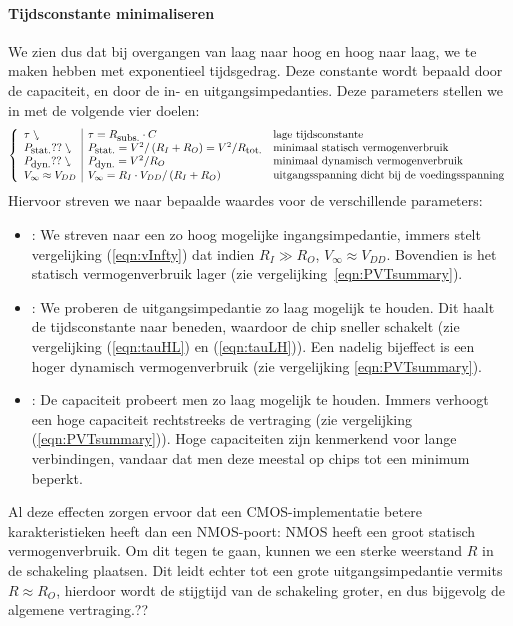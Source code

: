 \paragraph{Tijdsconstante minimaliseren}
We zien dus dat bij overgangen van laag naar hoog en hoog naar laag, we te maken hebben met exponentieel tijdsgedrag. Deze constante wordt bepaald door de capaciteit, en door de in- en uitgangsimpedanties. Deze parameters stellen we in met de volgende vier doelen:
\begin{equation}
\left\{\begin{array}{l|ll}
\tau\ssearrow&\tau=R_{\mbox{\small{subs.}}}\cdot C&\mbox{lage tijdsconstante}\\
P_{\mbox{\small{stat.}}}??\ssearrow&P_{\mbox{\small{stat.}}}=V^2/\left(R_I+R_O\right)=V^2/R_{\mbox{\small{tot.}}}&\mbox{minimaal statisch vermogenverbruik}\\
P_{\mbox{\small{dyn.}}}??\ssearrow&P_{\mbox{\small{dyn.}}}=V^2/R_O&\mbox{minimaal dynamisch vermogenverbruik}\\
V_{\infty}\approx V_{DD}&V_{\infty}=R_I\cdot V_{DD}/\left(R_I+R_O\right)&\mbox{uitgangsspanning dicht bij de voedingsspanning}\\
\end{array}\right.
\label{eqn:PVTsummary}
\end{equation}
Hiervoor streven we naar bepaalde waardes voor de verschillende parameters:
\begin{itemize}
 \item {}: We streven naar een zo hoog mogelijke ingangsimpedantie, immers stelt vergelijking (\ref{eqn:vInfty}) dat indien $R_I\gg R_O$, $V_{\infty}\approx V_{DD}$. Bovendien is het statisch vermogenverbruik lager (zie vergelijking~\ref{eqn:PVTsummary}).
 \item {}: We proberen de uitgangsimpedantie zo laag mogelijk te houden. Dit haalt de tijdsconstante naar beneden, waardoor de chip sneller schakelt (zie vergelijking (\ref{eqn:tauHL}) en (\ref{eqn:tauLH})). Een nadelig bijeffect is een hoger dynamisch vermogenverbruik (zie vergelijking \ref{eqn:PVTsummary}).
 \item {}: De capaciteit probeert men zo laag mogelijk te houden. Immers verhoogt een hoge capaciteit rechtstreeks de vertraging (zie vergelijking (\ref{eqn:PVTsummary})). Hoge capaciteiten zijn kenmerkend voor lange verbindingen, vandaar dat men deze meestal op chips tot een minimum beperkt.
\end{itemize}
Al deze effecten zorgen ervoor dat een CMOS-implementatie betere karakteristieken heeft dan een NMOS-poort: NMOS heeft een groot statisch vermogenverbruik. Om dit tegen te gaan, kunnen we een sterke weerstand $R$ in de schakeling plaatsen. Dit leidt echter tot een grote uitgangsimpedantie vermits $R\approx R_O$, hierdoor wordt de stijgtijd van de schakeling groter, en dus bijgevolg de algemene vertraging.??%
